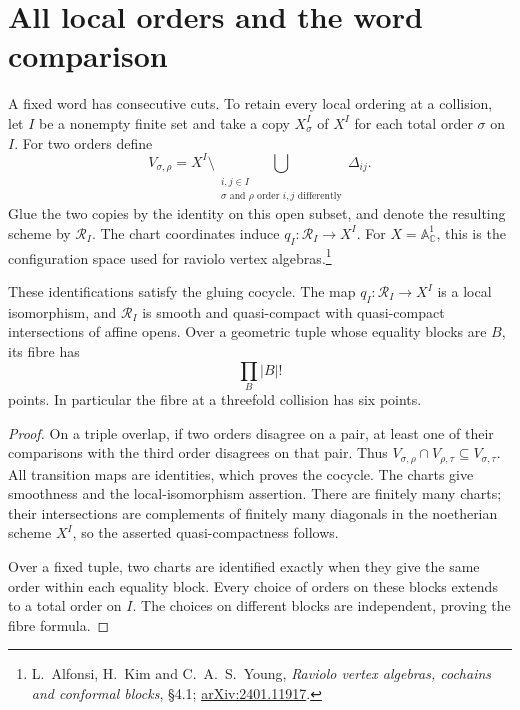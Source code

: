 \section{All local orders and the word comparison}
\label{v4-sec:word-ordered-atlas}

A fixed word has consecutive cuts. To retain every local ordering
at a collision, let \(I\) be a nonempty finite set and take a
copy \(X^I_\sigma\) of \(X^I\) for each total order \(\sigma\)
on \(I\). For two orders define
\[
 V_{\sigma,\rho}=
 X^I\setminus\bigcup_{\substack{i,j\in I\\
              \sigma\text{ and }\rho\text{ order }i,j\text{ differently}}}
                          \Delta_{ij}.
\]
Glue the two copies by the identity on this open subset, and denote
the resulting scheme by \(\mathscr R_I\).
The chart coordinates induce \(q_I:\mathscr R_I\to X^I\).
For \(X=\mathbb A^1_{\mathbb C}\), this is the configuration
space used for raviolo vertex algebras.\footnote{
L.~Alfonsi, H.~Kim and C.~A.~S.~Young,
\emph{Raviolo vertex algebras, cochains and conformal blocks},
\S4.1; \href{https://arxiv.org/abs/2401.11917}{arXiv:2401.11917}.}

\begin{proposition}
\label{v4-prop:word-ordered-atlas}
These identifications satisfy the gluing cocycle. The map
\(q_I:\mathscr R_I\to X^I\) is a local isomorphism, and
\(\mathscr R_I\) is smooth and quasi-compact with quasi-compact
intersections of affine opens. Over a geometric tuple whose equality
blocks are \(B\), its fibre has
\[
                    \prod_B |B|!
\]
points. In particular the fibre at a threefold collision has six
points.
\end{proposition}

\begin{proof}
On a triple overlap, if two orders disagree on a pair, at least
one of their comparisons with the third order disagrees on that
pair. Thus
\(V_{\sigma,\rho}\cap V_{\rho,\tau}\subseteq V_{\sigma,\tau}\).
All transition maps are identities, which proves the cocycle.
The charts give smoothness and the local-isomorphism assertion.
There are finitely many charts; their intersections are complements
of finitely many diagonals in the noetherian scheme \(X^I\),
so the asserted quasi-compactness follows.

Over a fixed tuple, two charts are identified exactly when they
give the same order within each equality block. Every choice of
orders on these blocks extends to a total order on \(I\).
The choices on different blocks are independent, proving the
fibre formula.
\end{proof}

